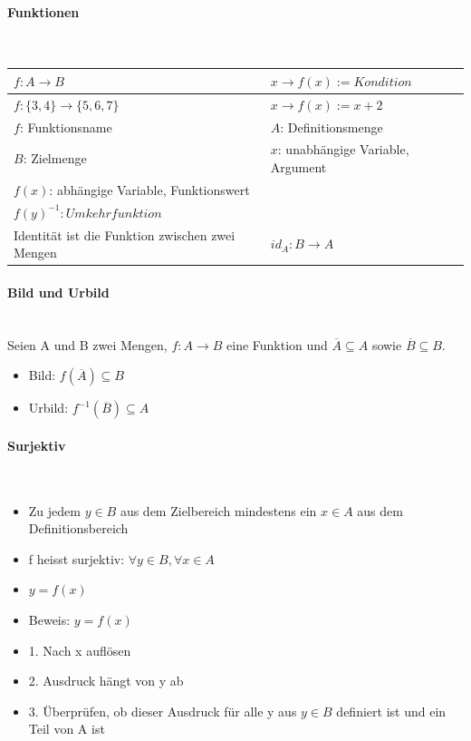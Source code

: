\paragraph{Funktionen}\mbox{}\\
\begin{tabularx}{\columnwidth}{@{}X|X@{}}
    \hline
    $f : A \rightarrow B$                           & $x \rightarrow f(x) := Kondition$   \\ \hline
    $f : \{3,4\} \rightarrow \{5,6,7\}$             & $x \rightarrow f(x) := x + 2$       \\ \hline
    $f$: Funktionsname                              & $A$: Definitionsmenge               \\ \hline
    $B$: Zielmenge                                  & $x$: unabhängige Variable, Argument \\ \hline
    $f(x)$: abhängige Variable, Funktionswert                                             \\ \hline
    $f(y)^{-1}: Umkehrfunktion$                                                           \\ \hline
    Identität ist die Funktion zwischen zwei Mengen & $id_A : B \rightarrow A$            \\ \hline
\end{tabularx}
\vspace{1mm}

\paragraph{Bild und Urbild}\mbox{}\\
Seien A und B zwei Mengen, $f: A \rightarrow B$ eine Funktion und $\overline{A} \subseteq A$ sowie $\overline{B} \subseteq B$.
\begin{itemize}
    \item Bild: $f(\overline{A}) \subseteq B$
    \item Urbild: $f^{-1}(\overline{B}) \subseteq A$
\end{itemize}
\vspace{1mm}

\paragraph{Surjektiv}\mbox{}\\
\begin{itemize}
    \item Zu jedem $y\in B$ aus dem Zielbereich mindestens ein $x\in A$ aus dem Definitionsbereich
    \item f heisst surjektiv: $\forall y \in B, \forall x \in A$
    \item $y= f(x)$
    \item Beweis: $y = f(x)$
    \item 1. Nach x auflösen
    \item 2. Ausdruck hängt von y ab
    \item 3. Überprüfen, ob dieser Ausdruck für alle y aus $y\in B$ definiert ist und ein Teil von A ist
\end{itemize}
\vspace{1mm}

